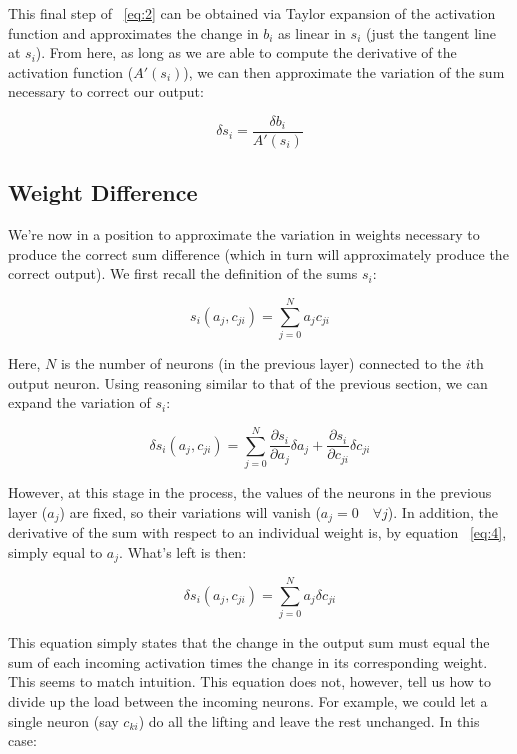 \documentclass{article}[12pt]
\begin{document}
This final step of ~\ref{eq:2} can be obtained via Taylor expansion of the activation function and approximates the change in $b_i$ as linear in $s_i$ (just the tangent line at $s_i$). From here, as long as we are able to compute the derivative of the activation function ($A'(s_i)$), we can then approximate the variation of the sum necessary to correct our output:

\begin{equation}
    \delta s_i = \frac{\delta b_i}{A'(s_i)}
    \label{eq:3}
\end{equation}


\subsection{Weight Difference}

We're now in a position to approximate the variation in weights necessary to produce the correct sum difference (which in turn will approximately produce the correct output). We first recall the definition of the sums $s_i$:

\begin{equation}
    s_i(a_j, c_{ji}) = \sum_{j=0}^N a_j c_{ji}
    \label{eq:4}
\end{equation}

Here, $N$ is the number of neurons (in the previous layer) connected to the $i$th output neuron. Using reasoning similar to that of the previous section, we can expand the variation of $s_i$:

\begin{equation}
    \delta s_i(a_j, c_{ji}) = \sum_{j=0}^N \frac{\partial s_i}{\partial a_j} \delta a_j + \frac{\partial s_i}{\partial c_{ji}} \delta c_{ji}
    \label{eq:5}
\end{equation}

However, at this stage in the process, the values of the neurons in the previous layer ($a_j$) are fixed, so their variations will vanish ($a_j = 0  \quad \forall j$). In addition, the derivative of the sum with respect to an individual weight is, by equation ~\ref{eq:4}, simply equal to $a_j$. What's left is then:

\begin{equation}
    \delta s_i(a_j, c_{ji}) = \sum_{j=0}^N a_j \delta c_{ji}
    \label{eq:6}
\end{equation}


This equation simply states that the change in the output sum must equal the sum of each incoming activation times the change in its corresponding weight. This seems to match intuition. This equation does not, however, tell us how to divide up the load between the incoming neurons. For example, we could let a single neuron (say $c_{ki}$) do all the lifting and leave the rest unchanged. In this case:
\end{document}
